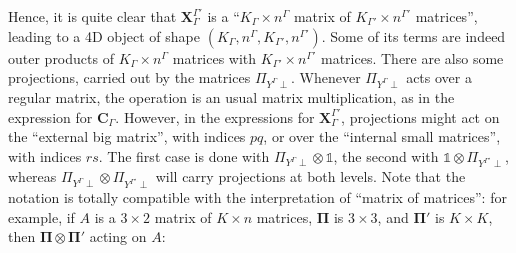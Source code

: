 \documentclass[a4paper,11pt]{article}
\newcommand{\irp}{\ensuremath{\Gamma}}
\newcommand{\irpP}{{\ensuremath{\Gamma'}}}
\begin{document}
Hence, it is quite clear that $\mathbf{X}_\irp^\irpP$ is a ``$K_\irp \times n^\irp$ matrix of $K_\irpP \times n^\irpP$ matrices'', leading to a 4D object of shape $(K_\irp, n^\irp,K_\irpP, n^\irpP)$.
Some of its terms are indeed outer products of $K_\irp \times n^\irp$ matrices with $K_\irpP \times n^\irpP$ matrices.
There are also some projections, carried out by the matrices $\Pi_{Y^\irp \perp}$.
Whenever $\Pi_{Y^\irp \perp}$ acts over a regular matrix, the operation is an usual matrix multiplication, as in the expression for $\mathbf{C}_\irp$.
However, in the expressions for $\mathbf{X}_\irp^\irpP$, projections might act on the ``external big matrix'', with indices $pq$, or over the ``internal small matrices'', with indices $rs$.
The first case is done with $\Pi_{Y^\irp \perp} \otimes \mathbb{1}$, the second with $\mathbb{1} \otimes \Pi_{Y^\irpP \perp}$, whereas $\Pi_{Y^\irp \perp} \otimes \Pi_{Y^\irpP \perp}$ will carry projections at both levels.
Note that the notation is totally compatible with the interpretation of ``matrix of matrices'':
for example, if $A$ is a $3 \times 2$ matrix of $K \times n$ matrices, $\mathbf{\Pi}$ is $3 \times 3$, and $\mathbf{\Pi}'$ is $K \times K$, then $\mathbf{\Pi} \otimes \mathbf{\Pi}'$ acting on $A$:
\end{document}
